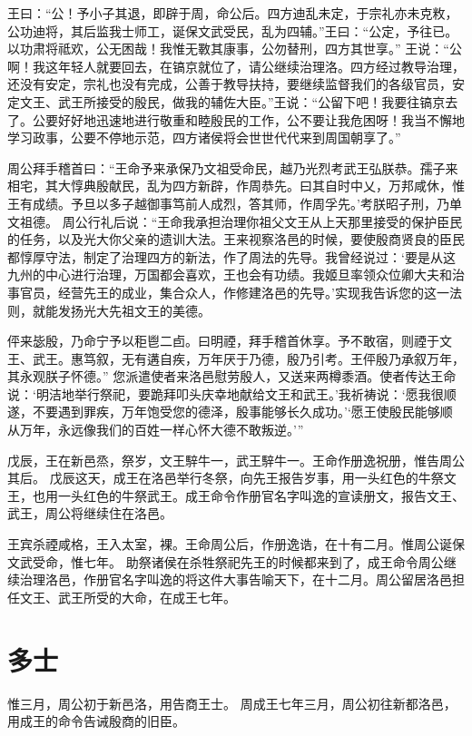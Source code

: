 \documentclass[12pt,UTF8]{ctexbook}
\begin{document}
王曰：“公！予小子其退，即辟于周，命公后。四方迪乱未定，于宗礼亦未克敉，公功迪将，其后监我士师工，诞保文武受民，乱为四辅。”王曰：“公定，予往已。以功肃将祗欢，公无困哉！我惟无斁其康事，公勿替刑，四方其世享。”
王说：“公啊！我这年轻人就要回去，在镐京就位了，请公继续治理洛。四方经过教导治理，还没有安定，宗礼也没有完成，公善于教导扶持，要继续监督我们的各级官员，安定文王、武王所接受的殷民，做我的辅佐大臣。”王说：“公留下吧！我要往镐京去了。公要好好地迅速地进行敬重和睦殷民的工作，公不要让我危困呀！我当不懈地学习政事，公要不停地示范，四方诸侯将会世世代代来到周国朝享了。”

周公拜手稽首曰：“王命予来承保乃文祖受命民，越乃光烈考武王弘朕恭。孺子来相宅，其大惇典殷献民，乱为四方新辟，作周恭先。曰其自时中乂，万邦咸休，惟王有成绩。予旦以多子越御事笃前人成烈，答其师，作周孚先。’考朕昭子刑，乃单文祖德。
周公行礼后说：“王命我承担治理你祖父文王从上天那里接受的保护臣民的任务，以及光大你父亲的遗训大法。王来视察洛邑的时候，要使殷商贤良的臣民都惇厚守法，制定了治理四方的新法，作了周法的先导。我曾经说过：‘要是从这九州的中心进行治理，万国都会喜欢，王也会有功绩。我姬旦率领众位卿大夫和治事官员，经营先王的成业，集合众人，作修建洛邑的先导。’实现我告诉您的这一法则，就能发扬光大先祖文王的美德。

伻来毖殷，乃命宁予以秬鬯二卣。曰明禋，拜手稽首休享。予不敢宿，则禋于文王、武王。惠笃叙，无有遘自疾，万年厌于乃德，殷乃引考。王伻殷乃承叙万年，其永观朕子怀德。”
您派遣使者来洛邑慰劳殷人，又送来两樽黍酒。使者传达王命说：‘明洁地举行祭祀，要跪拜叩头庆幸地献给文王和武王。’我祈祷说：‘愿我很顺遂，不要遇到罪疾，万年饱受您的德泽，殷事能够长久成功。’‘愿王使殷民能够顺从万年，永远像我们的百姓一样心怀大德不敢叛逆。’”

戊辰，王在新邑烝，祭岁，文王騂牛一，武王騂牛一。王命作册逸祝册，惟告周公其后。
戊辰这天，成王在洛邑举行冬祭，向先王报告岁事，用一头红色的牛祭文王，也用一头红色的牛祭武王。成王命令作册官名字叫逸的宣读册文，报告文王、武王，周公将继续住在洛邑。

王宾杀禋咸格，王入太室，裸。王命周公后，作册逸诰，在十有二月。惟周公诞保文武受命，惟七年。
助祭诸侯在杀牲祭祀先王的时候都来到了，成王命令周公继续治理洛邑，作册官名字叫逸的将这件大事告喻天下，在十二月。周公留居洛邑担任文王、武王所受的大命，在成王七年。

\chapter{多士}

惟三月，周公初于新邑洛，用告商王士。
周成王七年三月，周公初往新都洛邑，用成王的命令告诫殷商的旧臣。
\end{document}
